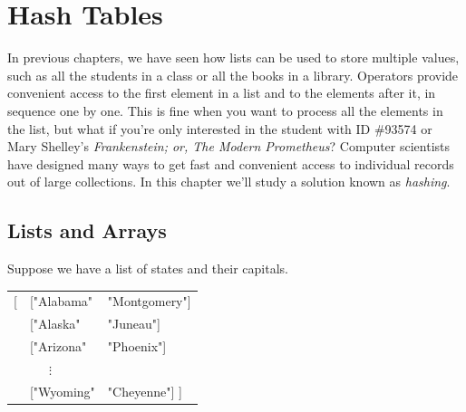 \chapter{Hash Tables}
\label{ch:hash-tables}

In previous chapters, we have seen how lists can be used to store
multiple values, such as all the students in a class or all the books
in a library. Operators provide convenient access to the first element
in a list and to the elements after it, in sequence one by one.
This is fine when you want to
process all the elements in the list, but what if you're only interested
in the student with ID \#93574 or Mary Shelley's
\emph{Frankenstein; or, The Modern Prometheus}?
Computer scientists have designed many
ways to get fast and convenient access
to individual records out of large collections.
In this chapter we'll study a solution known as \emph{hashing}.

\section{Lists and Arrays}

Suppose we have a list of states and their
\label{states-capitals-list}capitals.
\begin{center}
\begin{tabular}{lll}
\textsf{[} &\textsf{["Alabama"}  &\textsf{"Montgomery"]}\\
  &\textsf{["Alaska"}   &\textsf{"Juneau"]}\\
  &\textsf{["Arizona"}  &\textsf{"Phoenix"]}\\
  &~~~$\vdots$     &\\
  &\textsf{["Wyoming"}  &\textsf{"Cheyenne"] ]}\\
\end{tabular}
\end{center}

